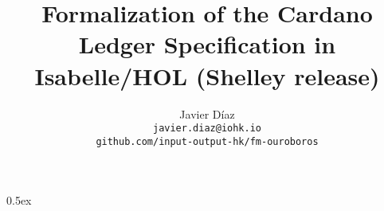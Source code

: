\documentclass[a4paper,11pt]{article}
\begin{document}
\title{Formalization of the Cardano Ledger Specification in Isabelle/HOL (Shelley release)}
\author{Javier D\'iaz\\\small\texttt{javier.diaz@iohk.io}\\\small\texttt{github.com/input-output-hk/fm-ouroboros}}

\maketitle

\tableofcontents

\parindent 0pt\parskip 0.5ex


\end{document}
